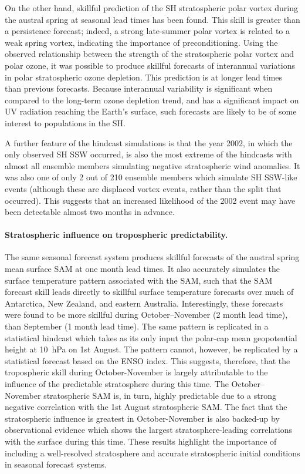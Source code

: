 On the other hand, skillful prediction of the SH stratospheric polar vortex
during the austral spring at seasonal lead times has been found. This skill is
greater than a persistence forecast; indeed, a strong late-summer polar vortex
is related to a weak spring vortex, indicating the importance of
preconditioning. Using the observed relationship between the strength of the
stratospheric polar vortex and polar ozone, it was possible to produce skillful
forecasts of interannual variations in polar stratospheric ozone depletion. This
prediction is at longer lead times than previous forecasts. Because interannual
variability is significant when compared to the long-term ozone depletion trend,
and has a significant impact on UV radiation reaching the Earth's surface, such
forecasts are likely to be of some interest to populations in the SH.

A further feature of the hindcast simulations is that the year 2002, in which
the only observed SH SSW occurred, is also the most extreme of the hindcasts
with almost all ensemble members simulating negative stratospheric wind
anomalies. It was also one of only 2 out of 210 ensemble members which simulate
SH SSW-like events (although these are displaced vortex events, rather than the
split that occurred). This suggests that an increased likelihood of the 2002
event may have been detectable almost two months in advance.

\paragraph{Stratospheric influence on tropospheric predictability.} The same
seasonal forecast system produces skillful forecasts of the austral spring mean
surface SAM at one month lead times. It also accurately simulates the surface
temperature pattern associated with the SAM, such that the SAM forecast skill
leads directly to skillful surface temperature forecasts over much of Antarctica,
New Zealand, and eastern Australia. Interestingly, these forecasts were found to
be more skillful during October--November (2 month lead time), than September (1
month lead time). The same pattern is replicated in a statistical hindcast which
takes as its only input the polar-cap mean geopotential height at 10~hPa on 1st
August. The pattern cannot, however, be replicated by a statistical forecast
based on the ENSO index. This suggests, therefore, that the tropospheric skill
during October-November is largely attributable to the influence of the
predictable stratosphere during this time. The October--November stratospheric
SAM is, in turn, highly predictable due to a strong negative correlation with
the 1st August stratospheric SAM. The fact that the stratospheric influence is
greatest in October-November is also backed-up by observational evidence which
shows the largest stratosphere-leading correlations with the surface during this
time. These results highlight the importance of including a well-resolved
stratosphere and accurate stratospheric initial conditions in seasonal forecast
systems.

